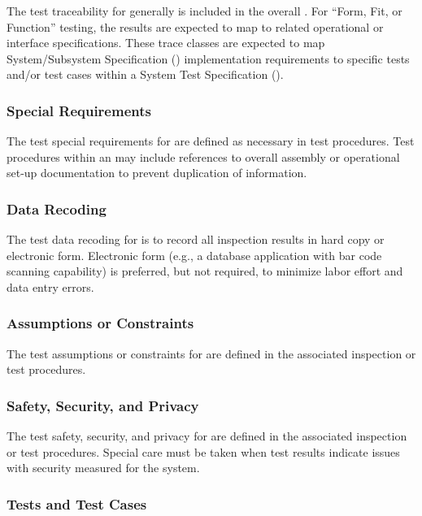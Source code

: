 The test traceability for \TestIdNameX generally is included in the overall \RTVM.
For ``Form, Fit, or Function'' testing, the results are expected to map to related operational or interface specifications.
These trace classes are expected to map System/Subsystem Specification (\SSS) implementation requirements to specific tests and/or test cases within a System Test Specification (\STS).

\subsubsection{Special Requirements}
\label{loc:TestSpecialRequirements\TestIdName}

The test special requirements for \TestIdNameX are defined as necessary in test procedures.
Test procedures within an \STS may include references to overall assembly or operational set-up documentation to prevent duplication of information.

\subsubsection{Data Recoding}
\label{loc:TestDataRecoding\TestIdName}

The test data recoding for \TestIdNameX is to record all inspection results in hard copy or electronic form.
Electronic form (e.g., a database application with bar code scanning capability) is preferred, but not required, to minimize labor effort and data entry errors.

\subsubsection{Assumptions or Constraints}
\label{loc:TestAssumptionsOrConstraints\TestIdName}

The test assumptions or constraints for \TestIdNameX are defined in the associated inspection or test procedures.

\subsubsection{Safety, Security, and Privacy}
\label{loc:TestSafetySecurityPrivacy\TestIdName}

The test safety, security, and privacy for \TestIdNameX are defined in the associated inspection or test procedures.
Special care must be taken when test results indicate issues with security measured for the system.

\subsubsection{Tests and Test Cases}
\label{loc:TestsAndTestCases\TestIdName}

